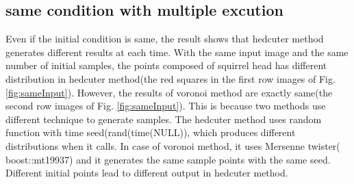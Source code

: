 \documentclass[11pt]{article}
\begin{document}
\subsection{same condition with multiple excution}
Even if the initial condition is same, the result shows that hedcuter method generates different results at each time. With the same input image and the same number of initial samples, the points composed of squirrel head has different distribution in hedcuter method(the red squares in the first row images of Fig. \ref{fig:sameInput}). However, the results of voronoi method are exactly same(the second row images of Fig. \ref{fig:sameInput}). This is because two methods use different technique to generate samples. The hedcuter method uses random function with time seed(rand(time(NULL)), which produces different distributions when it calls. In case of voronoi method, it uses Mersenne twister(
boost::mt19937) and it generates the same sample points with the same seed. Different initial points lead to different output in hedcuter method.
\end{document}
